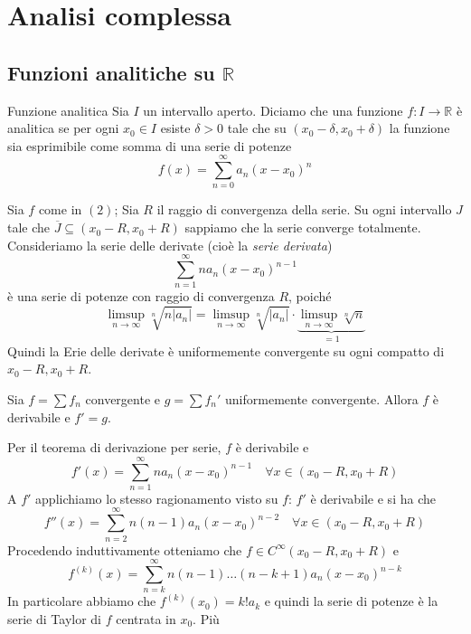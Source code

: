 \section{Analisi complessa}

\subsection{Funzioni analitiche su \(\mathbb{R}\) }
\begin{definition}{Funzione analitica}
    Sia \(I\) un intervallo aperto. Diciamo che una funzione \(f: I \to
    \mathbb{R}\) è analitica se per ogni \(x_{0} \in I\) esiste \(\delta > 0\)
    tale che su \((x_{0} - \delta, x_{0} + \delta)\) la funzione sia esprimibile
    come somma di una serie di potenze 
    \begin{equation}
        f(x) = \sum_{n=0}^{\infty} a_{n} {(x - x_{0})}^{n} 
    \end{equation}
\end{definition}
Sia \(f\) come in \((2)\); Sia \(R\) il raggio di convergenza della serie. Su
ogni intervallo \(J\) tale che \(\overline{J} \subseteq (x_{0} - R, x_{0} + R)
\) sappiamo che la serie converge totalmente. Consideriamo la serie delle
derivate (cioè la \emph{serie derivata})
\[
    \sum_{n=1}^{\infty} n a_{n} {(x - x_{0})}^{n-1} 
\]
è una serie di potenze con raggio di convergenza \(R\), poiché 
\[
    \limsup_{n \to \infty} \sqrt[n]{n|a_{n}|} = \limsup_{n \to \infty}
    \sqrt[n]{|a_{n}|} \cdot \underbrace{\limsup_{n \to \infty} \sqrt[n]{n}}_{=1}
\]
Quindi la Erie delle derivate è uniformemente convergente su ogni compatto di
\(x_{0}-R, x_{0}+R\). 
\begin{lemma}
    Sia \(f = \sum f_{n}\) convergente e \(g = \sum f_{n}' \) uniformemente
    convergente. Allora \(f\) è derivabile e \(f' = g\).
\end{lemma}
Per il teorema di derivazione per serie, \(f\) è derivabile e
\[
    f'(x) = \sum_{n=1}^{\infty} n a_{n} {(x - x_{0})}^{n-1} \quad \forall x \in
    (x_{0} - R, x_{0}+R)
\]
A \(f'\) applichiamo lo stesso ragionamento visto su \(f\): \(f'\) è derivabile
e si ha che 
\[
    f''(x) = \sum_{n=2}^{\infty} n(n-1) a_{n} {(x - x_{0})}^{n-2} \quad \forall
    x \in (x_{0} - R, x_{0}+R)
\]
Procedendo induttivamente otteniamo che \(f \in C^{\infty}(x_{0} - R, x_{0}+R)\)
e
\[
    f^{(k)}(x) = \sum_{n=k}^{\infty} n(n-1) \dots (n-k+1) a_{n} {(x -
    x_{0})}^{n-k}
\]
In particolare abbiamo che \(\displaystyle f^{(k)}(x_{0}) = k! a_k\) e quindi la
serie di potenze è la serie di Taylor di \(f\) centrata in \(x_{0}\). Più

